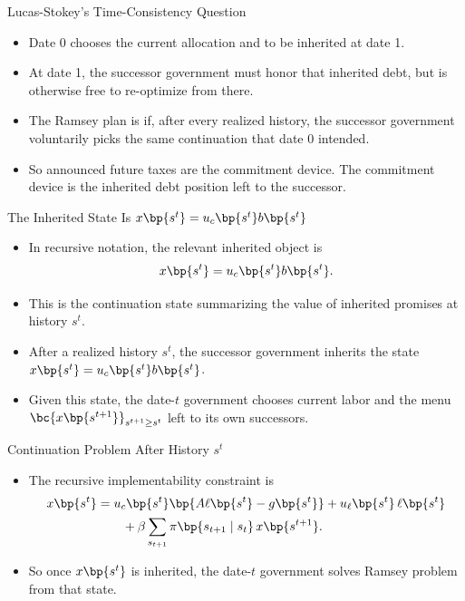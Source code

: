 \documentclass[11pt,xcolor={dvipsnames},aspectratio=159,hyperref={pdftex,pdfpagemode=UseNone,hidelinks,pdfdisplaydoctitle=true},usepdftitle=false]{beamer}
\begin{document}
            \begin{frame}{Lucas-Stokey's Time-Consistency Question}
                \begin{itemize}
                \item Date 0 chooses the current allocation and  to be inherited at date 1.
                \item At date 1, the successor government must honor that inherited debt, but is otherwise free to re-optimize from there.
                \item The Ramsey plan is  if, after every realized history, the successor government voluntarily picks the same continuation that date 0 intended.
                \item So announced future taxes are  the commitment device. The commitment device is the inherited debt position left to the successor.
                \end{itemize}
            \end{frame}

            \begin{frame}{The Inherited State Is $x\bp{s^t}=u_c\bp{s^t}b\bp{s^t}$}
                \begin{itemize}
                \item In recursive notation, the relevant inherited object is
                \[
                    x\bp{s^t} = u_c\bp{s^t} b\bp{s^t}.
                \]
                \item This is the continuation state summarizing the value of inherited promises at history $s^t$.
                \item After a realized history $s^t$, the successor government inherits the state $x\bp{s^t}=u_c\bp{s^t}b\bp{s^t}$.
                \item Given this state, the date-$t$ government chooses current labor and the menu $\bc{x\bp{s^{t+1}}}_{s^{t+1}\ge s^t}$ left to its own successors.
                \end{itemize}
            \end{frame}

            \begin{frame}{Continuation Problem After History $s^t$}
                \begin{itemize}
                \item The recursive implementability constraint is
                \small
                \begin{align*}
                    x\bp{s^t}
                    &=
                    u_c\bp{s^t}\bp{A\ell\bp{s^t}-g\bp{s^t}}
                    + u_\ell\bp{s^t}\,\ell\bp{s^t} \\
                    &\qquad + \beta \sum_{s_{t+1}} \pi\bp{s_{t+1}\mid s_t}\,
                    x\bp{s^{t+1}}.
                \end{align*}
                \normalsize
                \item So once $x\bp{s^t}$ is inherited, the date-$t$ government solves  Ramsey problem from that state.
                \end{itemize}
            \end{frame}
\end{document}

